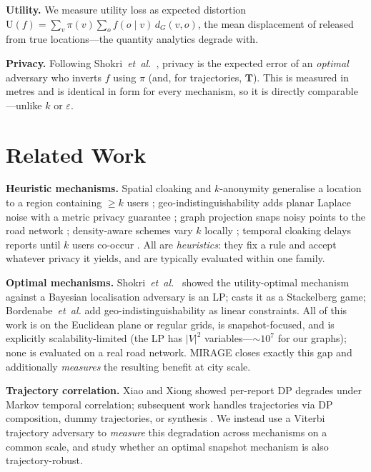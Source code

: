 \documentclass[10pt,journal,compsoc]{IEEEtran}
\newcommand{\dG}{d_{G}}
\begin{document}
\textbf{Utility.} We measure utility loss as expected distortion
$\mathrm{U}(f)=\sum_v \pi(v)\sum_o f(o\mid v)\,\dG(v,o)$, the mean displacement of
released from true locations---the quantity analytics degrade with.

\textbf{Privacy.} Following Shokri~\emph{et~al.}~\cite{shokri2011}, privacy is the
expected error of an \emph{optimal} adversary who inverts $f$ using $\pi$ (and,
for trajectories, $\mathbf{T}$). This is measured in metres and is identical in
form for every mechanism, so it is directly comparable---unlike $k$ or
$\varepsilon$.

\section{Related Work}
\label{sec:related}
\textbf{Heuristic mechanisms.} Spatial cloaking and $k$-anonymity generalise a
location to a region containing $\ge k$ users \cite{sweeney2002,gruteser2003,
mokbel2006,duckham2005}; geo-indistinguishability adds planar Laplace noise with a
metric privacy guarantee \cite{andres2013,chatzikokolakis2013}; graph projection
snaps noisy points to the road network \cite{bordenabe2014}; density-aware schemes
vary $k$ locally \cite{niu2014}; temporal cloaking delays reports until $k$ users
co-occur \cite{gruteser2003}. All are \emph{heuristics}: they fix a rule and
accept whatever privacy it yields, and are typically evaluated within one family.

\textbf{Optimal mechanisms.} Shokri~\emph{et~al.}~\cite{shokri2012} showed the
utility-optimal mechanism against a Bayesian localisation adversary is an LP;
\cite{shokri2015pets} casts it as a Stackelberg game; Bordenabe~\emph{et~al.}
\cite{bordenabe2014} add geo-indistinguishability as linear constraints. All of
this work is on the Euclidean plane or regular grids, is snapshot-focused, and is
explicitly scalability-limited (the LP has $|V|^2$ variables---$\sim$$10^7$ for
our graphs); none is evaluated on a real road network. MIRAGE closes exactly this
gap and additionally \emph{measures} the resulting benefit at city scale.

\textbf{Trajectory correlation.} Xiao and Xiong \cite{xiao2015} showed per-report
DP degrades under Markov temporal correlation; subsequent work handles
trajectories via DP composition, dummy trajectories, or synthesis
\cite{du2023,hu2024,buchholz2024}. We instead use a Viterbi trajectory adversary
to \emph{measure} this degradation across mechanisms on a common scale, and study
whether an optimal snapshot mechanism is also trajectory-robust.
\end{document}
